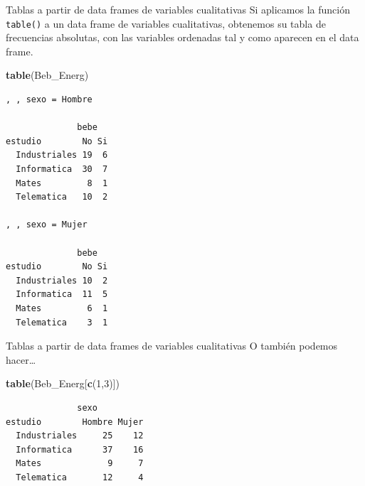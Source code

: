 \documentclass[
  ignorenonframetext,
]{beamer}
\newenvironment{Shaded}{\begin{snugshade}}{\end{snugshade}}
\newcommand{\DecValTok}[1]{\textcolor[rgb]{0.00,0.00,0.81}{#1}}
\newcommand{\FunctionTok}[1]{\textcolor[rgb]{0.13,0.29,0.53}{\textbf{#1}}}
\newcommand{\NormalTok}[1]{#1}
\begin{document}
\begin{frame}[fragile]{Tablas a partir de data frames de variables
cualitativas}
\label{tablas-a-partir-de-data-frames-de-variables-cualitativas-7}
Si aplicamos la función \texttt{table()} a un data frame de variables
cualitativas, obtenemos su tabla de frecuencias absolutas, con las
variables ordenadas tal y como aparecen en el data frame.

\begin{Shaded}
\begin{Highlighting}[]
\FunctionTok{table}\NormalTok{(Beb\_Energ)}
\end{Highlighting}
\end{Shaded}

\begin{verbatim}
, , sexo = Hombre

              bebe
estudio        No Si
  Industriales 19  6
  Informatica  30  7
  Mates         8  1
  Telematica   10  2

, , sexo = Mujer

              bebe
estudio        No Si
  Industriales 10  2
  Informatica  11  5
  Mates         6  1
  Telematica    3  1
\end{verbatim}
\end{frame}

\begin{frame}[fragile]{Tablas a partir de data frames de variables
cualitativas}
\label{tablas-a-partir-de-data-frames-de-variables-cualitativas-8}
O también podemos hacer\ldots{}

\begin{Shaded}
\begin{Highlighting}[]
\FunctionTok{table}\NormalTok{(Beb\_Energ[}\FunctionTok{c}\NormalTok{(}\DecValTok{1}\NormalTok{,}\DecValTok{3}\NormalTok{)])}
\end{Highlighting}
\end{Shaded}

\begin{verbatim}
              sexo
estudio        Hombre Mujer
  Industriales     25    12
  Informatica      37    16
  Mates             9     7
  Telematica       12     4
\end{verbatim}
\end{frame}
\end{document}
